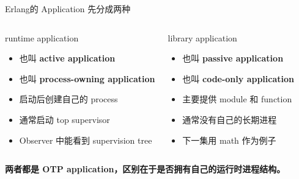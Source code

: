 \documentclass[aspectratio=169, 9pt]{beamer}
\newcommand{\keypoint}[1]{\textbf{\color{primary}#1}}
\newcommand{\good}[1]{\textbf{\color{accent!80!black}#1}}
\begin{document}
\begin{frame}{Erlang的 Application 先分成两种}
  \begin{columns}[T,onlytextwidth]
    \begin{block}{runtime application}
      \begin{itemize}
        \item 也叫 \keypoint{active application}
        \item 也叫 \keypoint{process-owning application}
        \item 启动后创建自己的 process
        \item 通常启动 top supervisor
        \item Observer 中能看到 supervision tree
      \end{itemize}
    \end{block}
    \footnotesize
    \begin{exampleblock}{library application}
      \begin{itemize}
        \item 也叫 \keypoint{passive application}
        \item 也叫 \keypoint{code-only application}
        \item 主要提供 module 和 function
        \item 通常没有自己的长期进程
        \item 下一集用 math 作为例子
      \end{itemize}
    \end{exampleblock}
  \end{columns}
  \vspace{0.25cm}
  \centering
  \good{两者都是 OTP application，区别在于是否拥有自己的运行时进程结构。}
\end{frame}
\end{document}
